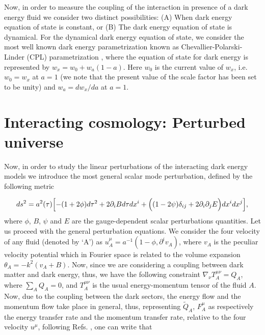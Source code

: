 \documentclass[superscriptaddress,oneolumn,secnumarabic,
amssymb,amsmath,nobibnotes,aps,prd,showpacs,nofootinbib]{revtex4}%
\begin{document}
Now, in order to measure the coupling of the interaction in presence of a dark energy fluid we consider two distinct possibilities: (A) When dark energy equation of state is constant, or (B) The dark energy equation of state is dynamical. For the dynamical dark energy equation of state, we consider the most well known dark energy parametrization known as Chevallier-Polarski-Linder (CPL) parametrization \cite{Chevallier:2000qy, Linder:2002et}, where the equation of state for dark energy is represented by $w_x= w_0 + w_a (1-a)$. Here $w_0$ is the current value of $w_{x}$, i.e. $w_0 = w_{x}$ at $a=1$ (we note that the present value of the scale factor has been set to be unity) and $w_a = dw_x/da$ at $a = 1$. 


\section{Interacting cosmology: Perturbed universe}
\label{sec-perturbations}


Now, in order to study the linear perturbations of the interacting dark energy models we introduce the most general scalar mode perturbation, defined by the following metric \cite{ref:Ma1995,ref:Mukhanov1992,ref:Malik2009}



\begin{eqnarray}
ds^2=a^2(\tau) \Bigl[ -(1+2\phi)d\tau^2+2\partial_iBd\tau dx^i+\Bigl((1-2\psi)\delta_{ij}+2\partial_i\partial_jE \Bigr)dx^idx^j \Bigr],
\label{eq:per-metric}
\end{eqnarray}
where $\phi$, $B$, $\psi$ and $E$ are the gauge-dependent scalar perturbations quantities. Let us proceed with the general perturbation equations. We consider the four velocity of any fluid (denoted by `A') as $u_A^{\mu}= a^{-1} (1- \phi, \partial^{i} v_A)$, where $v_A$ is the peculiar velocity potential which in Fourier space is related to the volume expansion $\theta_A = -k^2 (v_A + B)$. Now, since we are considering a coupling between dark matter and dark energy, thus, we have the following constraint $\nabla_{\nu} T_{A}^{\mu \nu} = Q_A$, where $\sum_{A} Q_A = 0$, and $T^{\mu \nu}_A$ is the usual energy-momentum tensor of the fluid $A$. Now, due to the coupling between the dark sectors, the energy flow and the momentum flow take place in general, thus, representing $\tilde{Q}_A$, $F_{A}^{\mu}$ as respectively the energy transfer rate and the momentum transfer rate, relative to the four velocity $u^{\mu}$, following Refs. \cite{ref:Valiviita2008, ref:Majerotto2010, Clemson:2011an}, one can write that
\end{document}
